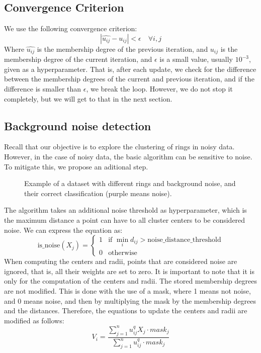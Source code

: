 \documentclass[conference]{IEEEtran}
\begin{document}
\subsection{Convergence Criterion}
We use the following convergence criterion:
\begin{equation}
|\hat{u_{ij}} - u_{ij}| < \epsilon \quad \forall i, j
\end{equation}
Where $\hat{u_{ij}}$ is the membership degree of the previous iteration, and $u_{ij}$ is the membership degree of the current iteration,
and $\epsilon$ is a small value, usually $10^{-3}$, given as a hyperparameter.
That is, after each update, we check for the difference between the membership degrees of the current and previous iteration, and if the difference is smaller than $\epsilon$,
we break the loop. However, we do not stop it completely, but we will get to that in the next section.

\subsection{Background noise detection}
Recall that our objective is to explore the clustering of rings in noisy data.
However, in the case of noisy data, the basic algorithm can be sensitive to noise. To mitigate this, we propose an aditional step.
\begin{figure}[H]
    \centering
    \resizebox{0.9\linewidth}{!}{}
    \label{fig:noisy_bg}
    \caption{Example of a dataset with different rings and background noise, and their correct classification (purple means noise).}
\end{figure}
The algorithm takes an additional noise threshold as hyperparameter, which is the maximum distance a point can have to all cluster centers to be considered noise.
We can express the equation as:
\begin{equation}
    \text{is\_noise}(X_j) = \begin{cases}
        1 & \text{if } \min_{i} d_{ij} > \text{noise\_distance\_threshold} \\
        0 & \text{otherwise}
    \end{cases}
\end{equation}
When computing the centers and radii, points that are considered noise are ignored, that is, all their weights are set to zero.
It is important to note that it is only for the computation of the centers and radii. The stored membership degrees are not modified.
This is done with the use of a mask, where 1 means not noise, and 0 means noise, and then by multiplying the mask by the membership degrees and the distances.
Therefore, the equations to update the centers and radii are modified as follows:
\begin{equation}\label{eq:V_i_new}
    V_i = \frac{\sum_{j=1}^{n} u_{ij}^q X_j \cdot mask_j}{\sum_{j=1}^{n} u_{ij}^q \cdot mask_j}
\end{equation}
\end{document}
